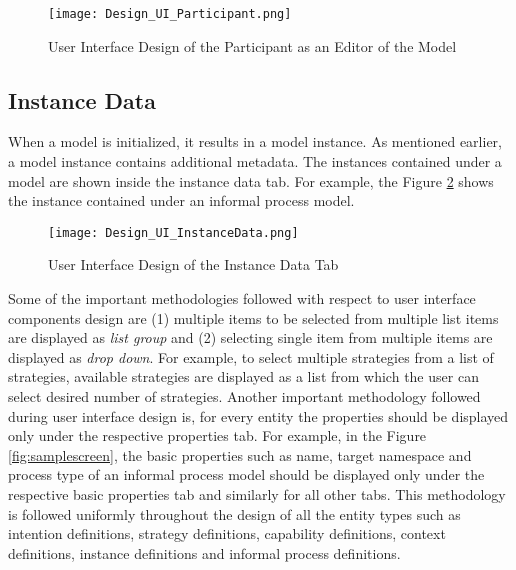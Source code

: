 \begin{figure} [H]
	\centering
	\texttt{[image: Design\_UI\_Participant.png]}
	\caption{User Interface Design of the Participant as an Editor of the Model}
	\label{fig:samplescreen_pl_editor}
\end{figure}

\subsection{Instance Data}
When a model is initialized, it results in a model instance. As mentioned earlier, a model instance contains additional metadata.
The instances contained under a model are shown inside the instance data tab. For example, the Figure \ref{fig:samplescreen_instance} shows the instance contained under an informal process model. 
  

\begin{figure} [H]
	\centering
	\texttt{[image: Design\_UI\_InstanceData.png]}
	\caption{User Interface Design of the Instance Data Tab}
	\label{fig:samplescreen_instance}
\end{figure}


Some of the important methodologies followed with respect to user interface components design are (1) multiple items to be selected from multiple list items are displayed as \textit{list group} and (2) selecting single item from multiple items are displayed as \textit{drop down}. For example, to select multiple strategies from a list of strategies, available strategies are displayed as a list from which the user can select desired number of strategies. Another important methodology followed during user interface design is, for every entity the properties should be displayed only under the respective properties tab. For example, in the Figure \ref{fig:samplescreen}, the basic properties such as name, target namespace and process type of an informal process model should be displayed only under the respective basic properties tab and similarly for all other tabs. This methodology is followed uniformly throughout the design of all the entity types such as intention definitions, strategy definitions, capability definitions, context definitions, instance definitions and informal process definitions. 

